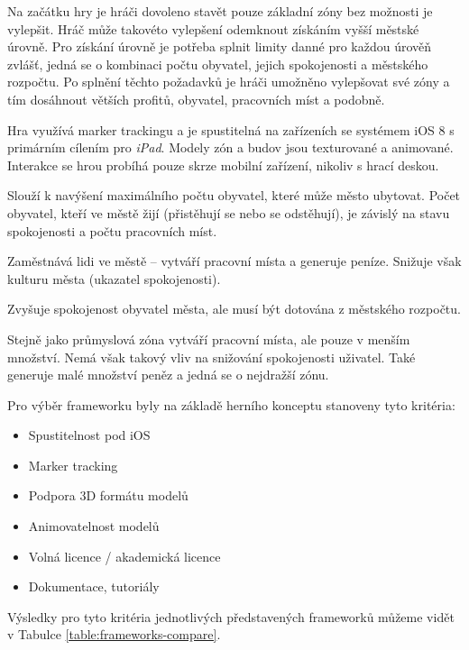 \documentclass[twoside,12pt]{article}
\begin{document}
Na začátku hry je hráči dovoleno stavět pouze základní zóny bez možnosti je vylepšit. Hráč může takovéto vylepšení odemknout získáním vyšší městské úrovně. Pro získání úrovně je potřeba splnit limity danné pro každou úrověň zvlášť, jedná se o kombinaci počtu obyvatel, jejich spokojenosti a městského rozpočtu. Po splnění těchto požadavků je hráči umožněno vylepšovat své zóny a tím dosáhnout větších profitů, obyvatel, pracovních míst a podobně.

Hra využívá marker trackingu a je spustitelná na zařízeních se systémem iOS 8 s primárním cílením pro \textit{iPad}. Modely zón a budov jsou texturované a animované. Interakce se hrou probíhá pouze skrze mobilní zařízení, nikoliv s hrací deskou.

Slouží k navýšení maximálního počtu obyvatel, které může město ubytovat. Počet obyvatel, kteří ve městě žijí (přistěhují se nebo se odstěhují), je závislý na stavu spokojenosti a počtu pracovních míst.

Zaměstnává lidi ve městě -- vytváří pracovní místa a generuje peníze. Snižuje však kulturu města (ukazatel spokojenosti). 

Zvyšuje spokojenost obyvatel města, ale musí být dotována z městského rozpočtu.

Stejně jako průmyslová zóna vytváří pracovní místa, ale pouze v menším množství. Nemá však takový vliv na snižování spokojenosti uživatel. Také generuje malé množství peněz a jedná se o nejdražší zónu.


Pro výběr frameworku byly na základě herního konceptu stanoveny tyto kritéria:
\begin{itemize}
	\item Spustitelnost pod iOS
	\item Marker tracking
	\item Podpora 3D formátu modelů
	\item Animovatelnost modelů
	\item Volná licence / akademická licence
	\item Dokumentace, tutoriály
\end{itemize}

Výsledky pro tyto kritéria jednotlivých představených frameworků můžeme vidět v Tabulce \ref{table:frameworks-compare}.

\end{document}
